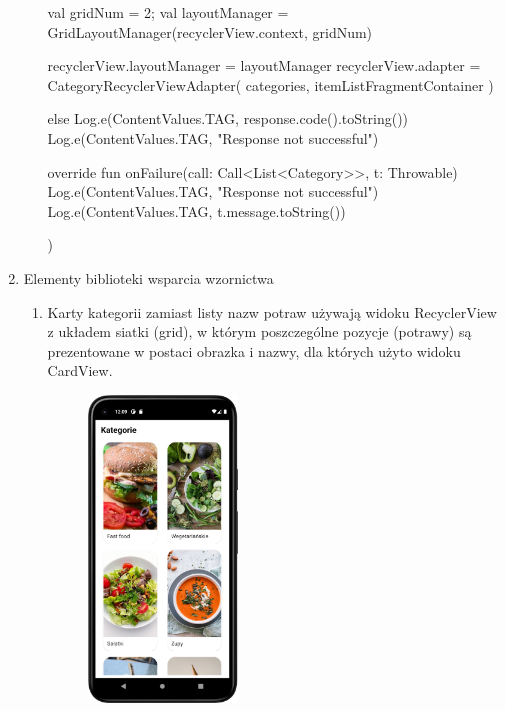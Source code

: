 \documentclass{article}
\begin{document}
\begin{enumerate}
\begin{enumerate}
\begin{mylisting}
{{{{                val gridNum = 2;
                val layoutManager = GridLayoutManager(recyclerView.context, gridNum)

                recyclerView.layoutManager = layoutManager
                recyclerView.adapter = CategoryRecyclerViewAdapter(
                    categories, itemListFragmentContainer
                )
            } else {
                Log.e(ContentValues.TAG, response.code().toString())
                Log.e(ContentValues.TAG, "Response not successful")
            }
        }

        override fun onFailure(call: Call<List<Category>>, t: Throwable) {
            Log.e(ContentValues.TAG, "Response not successful")
            Log.e(ContentValues.TAG, t.message.toString())
        }
    })
}
\end{mylisting}

    \end{enumerate}

\newpage

\item Elementy biblioteki wsparcia wzornictwa


\begin{enumerate}
    \item Karty kategorii zamiast listy nazw potraw używają 
    widoku RecyclerView z układem siatki (grid), 
    w którym poszczególne pozycje (potrawy) są prezentowane 
    w postaci obrazka i nazwy, dla których użyto widoku CardView. 

    \begin{figure}[ht]
        \centering
        \includegraphics[width=0.4\textwidth]{../res/category_view}
    \end{figure}


\end{enumerate}
\end{enumerate}
\end{document}
